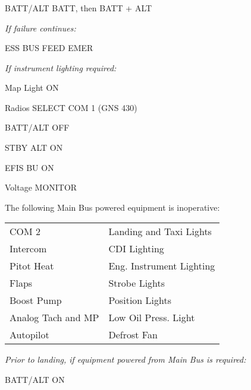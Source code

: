 \begin{multicols}{2}
\columnbreak
\subsubsection*{}

\begin{enumerate*}
\item BATT/ALT \dotfill BATT, then BATT + ALT
\item \emph{If failure continues:}

\begin{itemize*}
\item ESS BUS FEED \dotfill EMER
\item \emph{If instrument lighting required:}

\begin{itemize*}
\item[\textbullet] Map Light \dotfill ON
\end{itemize*}
\item Radios \dotfill SELECT COM 1 (GNS 430)
\item BATT/ALT \dotfill OFF
\item STBY ALT \dotfill ON
\item EFIS BU \dotfill ON
\item Voltage \dotfill MONITOR
\item The following Main Bus powered equipment is inoperative:

\begin{tabular}{ll}
COM 2&Landing and Taxi Lights\\
Intercom&CDI Lighting\\
Pitot Heat&Eng. Instrument Lighting\\
Flaps&Strobe Lights\\
Boost Pump&Position Lights\\
Analog Tach and MP&Low Oil Press. Light\\
Autopilot&Defrost Fan\\
\end{tabular}
\item \emph{Prior to landing, if equipment powered from Main Bus is required:}
\begin{itemize*}
\item BATT/ALT \dotfill ON
\end{itemize*}
\end{itemize*}
\end{enumerate*}


\end{multicols}
